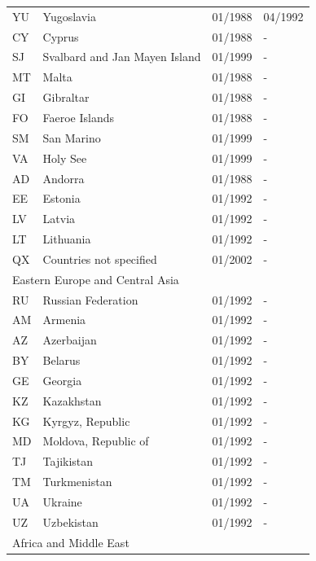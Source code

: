 \begin{scriptsize}
\begin{longtable}{lp{8cm}p{2cm}p{2cm}}
	YU   &   Yugoslavia                       &   01/1988   &   04/1992  \\
	CY   &   Cyprus                           &   01/1988   &   -  \\
	SJ   &   Svalbard and Jan Mayen Island    &   01/1999   &   -  \\
	MT   &   Malta                            &   01/1988   &   -  \\
	GI   &   Gibraltar                        &   01/1988   &   -  \\
	FO   &   Faeroe Islands                   &   01/1988   &   -  \\
	SM   &   San Marino                       &   01/1999   &   -  \\
	VA   &   Holy See                         &   01/1999   &   -  \\
	AD   &   Andorra                          &   01/1988   &   -  \\
	EE   &   Estonia                          &   01/1992   &   -  \\
	LV   &   Latvia                           &   01/1992   &   -  \\
	LT   &   Lithuania                        &   01/1992   &   -  \\
	QX   &   Countries not specified          &   01/2002   &   -  \\
  \midrule
  \multicolumn{3}{l}{Eastern Europe and Central Asia}  &  \\
	RU & Russian Federation   & 01/1992 & -  \\
	AM & Armenia              & 01/1992 & -  \\
	AZ & Azerbaijan           & 01/1992 & -  \\
	BY & Belarus              & 01/1992 & -  \\
	GE & Georgia              & 01/1992 & -  \\
	KZ & Kazakhstan           & 01/1992 & -  \\
	KG & Kyrgyz, Republic     & 01/1992 & -  \\
	MD & Moldova, Republic of & 01/1992 & -  \\
	TJ & Tajikistan           & 01/1992 & -  \\
	TM & Turkmenistan         & 01/1992 & -  \\
	UA & Ukraine              & 01/1992 & -  \\
	UZ & Uzbekistan           & 01/1992 & -  \\
	\midrule
	\multicolumn{3}{l}{Africa and Middle East}  &  \\

\end{longtable}
\end{scriptsize}
